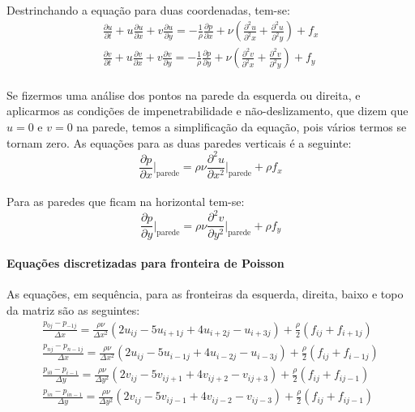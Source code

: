 \documentclass[a4paper,11pt]{article}
\begin{document}
\paragraph{} Destrinchando a equação para duas coordenadas, tem-se:
\begin{eqnarray}
\frac{\partial u}{\partial t}+u\frac{\partial u}{\partial x}+v\frac{\partial
u}{\partial y}=-\frac{1}{\rho}\frac{\partial p}{\partial
x}+\nu\left(\frac{\partial^2 u}{\partial^2 x}+\frac{\partial^2 u}{\partial^2
y}\right)+f_x\\
\frac{\partial v}{\partial t}+u\frac{\partial v}{\partial x}+v\frac{\partial
v}{\partial y}=-\frac{1}{\rho}\frac{\partial p}{\partial
y}+\nu\left(\frac{\partial^2 v}{\partial^2 x}+\frac{\partial^2 v}{\partial^2
y}\right)+f_y
\end{eqnarray}
\paragraph{} Se fizermos uma análise dos pontos na parede da esquerda ou
direita, e aplicarmos as condições de impenetrabilidade e não-deslizamento, que
dizem que $u=0$ e $v=0$ na parede, temos a simplificação da equação, pois vários
termos se tornam zero. As equações para as duas paredes verticais é a seguinte:
\begin{equation}
\frac{\partial p}{\partial x}\Bigg|_{\textrm{parede}}=\rho\nu\frac{\partial^2
u}{\partial x^2}\Bigg|_{\textrm{parede}}+\rho f_x
\end{equation}
\paragraph{} Para as paredes que ficam na horizontal tem-se:
\begin{equation}
\frac{\partial p}{\partial y}\Bigg|_{\textrm{parede}}=\rho\nu\frac{\partial^2
v}{\partial y^2}\Bigg|_{\textrm{parede}}+\rho f_y
\end{equation}
\paragraph{Equações discretizadas para fronteira de Poisson} As equações, em
sequência, para as fronteiras da esquerda, direita, baixo e topo da matriz são
as seguintes:
\begin{eqnarray}
\frac{p_{0j}-p_{-1j}}{\Delta x}=\frac{\rho\nu}{\Delta x^2}(2u_{ij}-5u_{i+1j}+4u_{i+2j}-u_{i+3j})+\frac{\rho}{2}(f_{ij}+f_{i+1j})\\
\frac{p_{nj}-p_{n-1j}}{\Delta x}=\frac{\rho\nu}{\Delta x^2}(2u_{ij}-5u_{i-1j}+4u_{i-2j}-u_{i-3j})+\frac{\rho}{2}(f_{ij}+f_{i-1j})\\
\frac{p_{i0}-p_{i-1}}{\Delta y}=\frac{\rho\nu}{\Delta y^2}(2v_{ij}-5v_{ij+1}+4v_{ij+2}-v_{ij+3})+\frac{\rho}{2}(f_{ij}+f_{ij-1})\\
\frac{p_{in}-p_{in-1}}{\Delta y}=\frac{\rho\nu}{\Delta y^2}(2v_{ij}-5v_{ij-1}+4v_{ij-2}-v_{ij-3})+\frac{\rho}{2}(f_{ij}+f_{ij-1})
\end{eqnarray}
\end{document}
